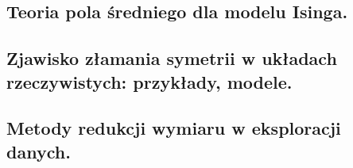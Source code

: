 \documentclass[10pt,a4paper]{article} %
\begin{document}
	\subsection{Teoria pola średniego dla modelu Isinga.}
	
	
	\subsection{Zjawisko złamania symetrii w układach rzeczywistych: przykłady, modele.}
	
	
	\subsection{Metody redukcji wymiaru w eksploracji danych.}
	
	
\end{document}

